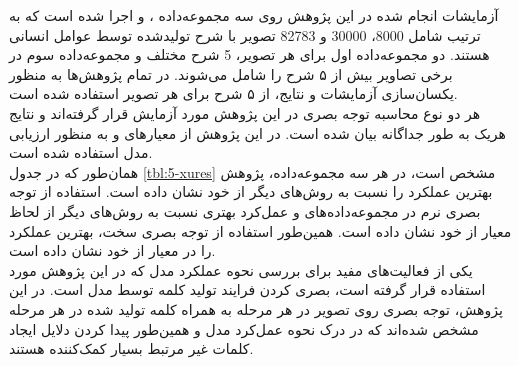 آزمایشات انجام شده در این پژوهش روی سه مجموعه‌داده
 ،
 و
  اجرا شده است که به ترتیب شامل 8000، 30000 و 82783 تصویر با شرح تولید‌شده توسط عوامل انسانی هستند. دو مجموعه‌داده اول برای هر تصویر، 5 شرح مختلف و مجموعه‌داده سوم در برخی تصاویر بیش از ۵ شرح را شامل می‌شوند. در تمام پژوهش‌ها به منظور یکسان‌سازی آزمایشات و نتایج، از ۵ شرح برای هر تصویر استفاده شده است. 
  \\
  هر دو نوع محاسبه توجه بصری در این پژوهش مورد آزمایش قرار گرفته‌اند و نتایج هریک به طور جداگانه بیان شده است. در این پژوهش از معیارهای  و  به منظور ارزیابی مدل استفاده شده است.
  \\
همان‌طور که در جدول \ref{tbl:5-xures} مشخص است، در هر سه مجموعه‌داده،‌ پژوهش \cite{xu2015show} بهترین عملکرد را نسبت به روش‌های دیگر از خود نشان داده است. استفاده از توجه بصری نرم در مجموعه‌داده‌های  و  عمل‌کرد بهتری نسبت به روش‌های دیگر از لحاظ معیار  از خود نشان داده‌ است. همین‌طور استفاده از توجه بصری سخت، بهترین عملکرد را در معیار  از خود نشان داده است.
\\
یکی از فعالیت‌های مفید برای بررسی نحوه عملکرد مدل که در این پژوهش مورد استفاده قرار گرفته است، بصری کردن فرایند تولید کلمه توسط مدل است. در این پژوهش، توجه بصری روی تصویر در هر مرحله به همراه کلمه تولید شده در هر مرحله مشخص شده‌اند که در درک نحوه عمل‌کرد مدل و همین‌طور پیدا کردن دلایل ایجاد کلمات غیر مرتبط بسیار کمک‌کننده هستند.  

